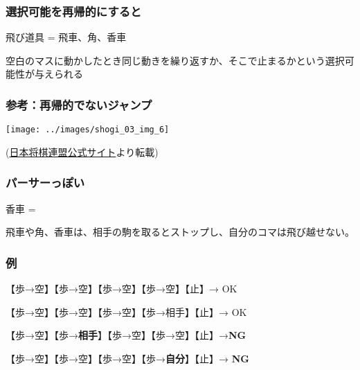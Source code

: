 \documentclass[xcolor=table]{beamer}
\begin{document}
\begin{mdframe}%

\frametitle{選択可能を再帰的にすると}\label{heading-section}%

\noindent{}飛び道具 = 飛車、角、香車%

空白のマスに動かしたとき同じ動きを繰り返すか、そこで止まるかという選択可能性が与えられる%
\end{mdframe}\label{section}%

\begin{mdframe}%

\frametitle{参考：再帰的でないジャンプ}\label{heading-section}%

\noindent{}\texttt{[image: ../images/shogi\_03\_img\_6]}{}%

(\href{https://www.shogi.or.jp/knowledge/shogi/03.html}{日本将棋連盟公式サイト}より転載)%
\end{mdframe}\label{section}%

\begin{mdframe}%

\frametitle{パーサーっぽい}\label{heading-section}%

\noindent{}香車 = %



飛車や角、香車は、相手の駒を取るとストップし、自分のコマは飛び越せない。%
\end{mdframe}\label{section}%

\begin{mdframe}%

\frametitle{例}\label{heading-section}%

\noindent{}【歩→空】【歩→空】【歩→空】【歩→空】【止】→ OK%

【歩→空】【歩→空】【歩→空】【歩→相手】【止】→ OK%

【歩→空】【歩→\textbf{相手}】【歩→空】【歩→空】【止】→\textbf{NG}%

【歩→空】【歩→空】【歩→空】【歩→\textbf{自分}】【止】→ \textbf{NG}%
\end{mdframe}\label{section}%
\end{document}
